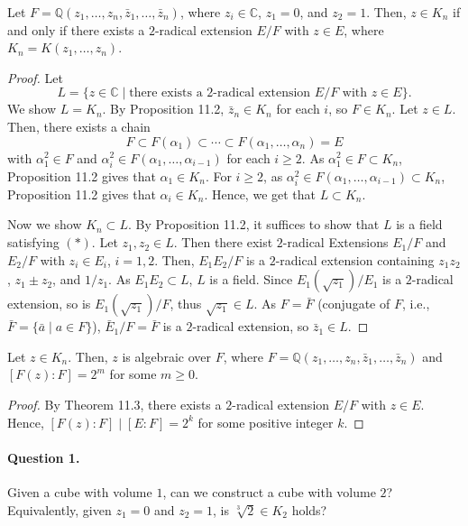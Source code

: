 \documentclass[twoside]{article}
\newcommand\Q{\mathbb Q}
\newcommand\C{\mathbb C}
\theoremstyle{remark}
\newcounter{theorem}
\begin{document}
\begin{theorem}
  Let \(F = \Q(z_1, \dots, z_n, \bar z_1, \dots, \bar z_n)\), where \(z_i \in \C\), \(z_1 = 0\), and \(z_2 = 1\). Then, \(z \in K_n\) if and only if there exists a \(2\)-radical extension \(E/F\) with \(z \in E\), where \(K_n = K(z_1, \dots, z_n)\).
\end{theorem}

\begin{proof}
  Let
  \[ L = \{z \in \C \mid \text{there exists a \(2\)-radical extension \(E/F\) with \(z \in E\)}\}. \]
  We show \(L = K_n\). By Proposition 11.2, \(\bar z_n \in K_n\) for each \(i\), so \(F \in K_n\). Let \(z \in L\). Then, there exists a chain
  \[ F \subset F(\alpha_1) \subset \cdots \subset F(\alpha_1, \dots, \alpha_n) = E \]
  with \(\alpha_1^2 \in F\) and \(\alpha_i^2 \in F(\alpha_1, \dots, \alpha_{i-1})\) for each \(i \geq 2\). As \(\alpha_1^2 \in F \subset K_n\), Proposition 11.2 gives that \(\alpha_1 \in K_n\). For \(i \geq 2\), as \(\alpha_i^2 \in F(\alpha_1, \dots, \alpha_{i-1}) \subset K_n\), Proposition 11.2 gives that \(\alpha_i \in K_n\). Hence, we get that \(L \subset K_n\).
  
  Now we show \(K_n \subset L\). By Proposition 11.2, it suffices to show that \(L\) is a field satisfying \((*)\). Let \(z_1, z_2 \in L\). Then there exist \(2\)-radical Extensions \(E_1/F\) and \(E_2/F\) with \(z_i \in E_i\), \(i=1,2\). Then, \(E_1 E_2/F\) is a \(2\)-radical extension containing \(z_1z_2\), \(z_1\pm z_2\), and \(1/z_1\). As \(E_1E_2 \subset L\), \(L\) is a field. Since \(E_1(\sqrt{z_1})/E_1\) is a \(2\)-radical extension, so is \(E_1(\sqrt{z_1})/F\), thus \(\sqrt{z_1} \in L\). As \(F = \bar F\) (conjugate of \(F\), i.e., \(\bar F = \{\bar a \mid a \in F\}\)), \(\bar E_1 / F = \bar F\) is a \(2\)-radical extension, so \(\bar z_1 \in L\).
\end{proof}

\begin{corollary}
  Let \(z \in K_n\). Then, \(z\) is algebraic over \(F\), where \(F = \Q(z_1, \dots, z_n, \bar z_1, \dots, \bar z_n)\) and \([F(z):F] = 2^m\) for some \(m \geq 0\).
\end{corollary}

\begin{proof}
  By Theorem 11.3, there exists a \(2\)-radical extension \(E/F\) with \(z \in E\). Hence, \([F(z):F] \mid [E:F] = 2^k\) for some positive integer \(k\).
\end{proof}

\paragraph{Question 1.} Given a cube with volume \(1\), can we construct a cube with volume \(2\)? Equivalently, given \(z_1 = 0\) and \(z_2 = 1\), is \(\sqrt[3]2 \in K_2\) holds?
\end{document}
